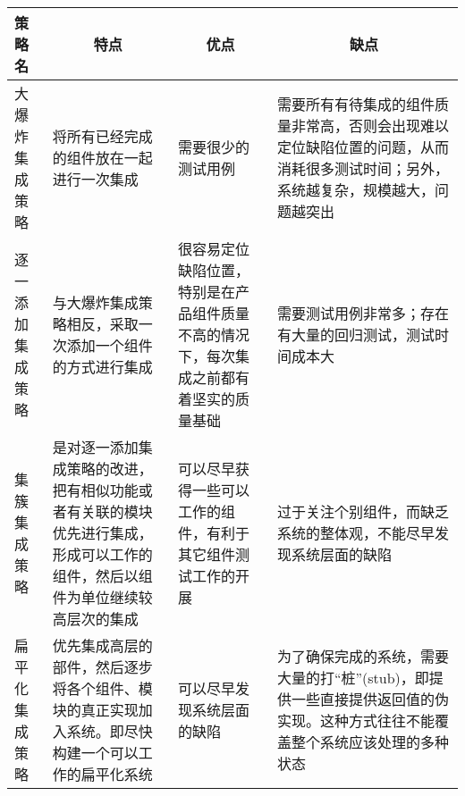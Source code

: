 \vspace{-0.5em}
\begin{spacing}{1.2}
    \centering
    \begin{longtable}{|m{2cm}<{\centering}|m{4.1cm}|m{4.1cm}|m{4.1cm}|}
        \hline
        \textbf{策略名} & \multicolumn{1}{c|}{\textbf{特点}}                               & \multicolumn{1}{c|}{\textbf{优点}}            & \multicolumn{1}{c|}{\textbf{缺点}}                                   \\ \hline
        大爆炸集成策略      & 将所有已经完成的组件放在一起进行一次集成                                           & 需要很少的测试用例                                   & 需要所有有待集成的组件质量非常高，否则会出现难以定位缺陷位置的问题，从而消耗很多测试时间；另外，系统越复杂，规模越大，问题越突出   \\ \hline
        逐一添加集成策略     & 与大爆炸集成策略相反，采取一次添加一个组件的方式进行集成                                   & 很容易定位缺陷位置，特别是在产品组件质量不高的情况下，每次集成之前都有着坚实的质量基础 & 需要测试用例非常多；存在有大量的回归测试，测试时间成本大                                       \\ \hline
        集簇集成策略       & 是对逐一添加集成策略的改进，把有相似功能或者有关联的模块优先进行集成，形成可以工作的组件，然后以组件为单位继续较高层次的集成 & 可以尽早获得一些可以工作的组件，有利于其它组件测试工作的开展              & 过于关注个别组件，而缺乏系统的整体观，不能尽早发现系统层面的缺陷                                   \\ \hline
        扁平化集成策略      & 优先集成高层的部件，然后逐步将各个组件、模块的真正实现加入系统。即尽快构建一个可以工作的扁平化系统              & 可以尽早发现系统层面的缺陷                               & 为了确保完成的系统，需要大量的打“桩”(stub)，即提供一些直接提供返回值的伪实现。这种方式往往不能覆盖整个系统应该处理的多种状态 \\ \hline
    \end{longtable}
\end{spacing}
\vspace{-1em}
